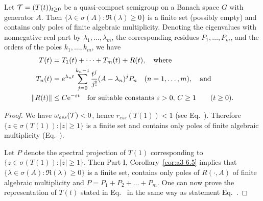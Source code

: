 \begin{theorem}\label{thm:b4-2.10}
  Let $\TT = (T(t))_{t \geq 0}$ be a quasi-compact semigroup on a Banach 
  space $G$ with generator $A$. Then 
  $\{\lambda \in \sigma(A) \colon \Re(\lambda) \geq 0\}$ is a finite set 
  (possibly empty) and contains only poles of finite algebraic multiplicity.
  Denoting the eigenvalues with nonneg­ative real part by 
  $\lambda_1, \dots, \lambda_m$, the corresponding residues 
  $P_1, \dots, P_m$, and the orders of the poles $k_1, \dots, k_m$, we have
  \begin{equation}\label{eq:b4-2.5}
    \begin{aligned}
      T(t) &= T_1(t) + \dots + T_m(t) + R(t), \quad \text{where} \\%
      T_n(t) &= e^{\lambda_n t} \sum_{j=0}^{k_n - 1} \frac{t^j}{j!}
               (A - \lambda_n)^j P_n
               \quad (n = 1, \dots, m), \quad \text{and} \\%
      \|R(t)\| &\leq C \eu^{-\epsilon t}
               \quad \text{for suitable constants } \epsilon > 0,\, C \geq 1
               \qquad (t \geq 0).
    \end{aligned}
  \end{equation}
\end{theorem}
\begin{proof} 
We have $\omega_{ess}(\mathcal{T}) < 0$, hence $r_{ess}(T(1)) < 1$ (see  Eq.~).
Therefore $\{z \in \sigma(T(1)) \colon |z| \geq 1\}$ is a finite set and contains only poles of finite algebraic multiplicity (\cf Eq.~). 

Let $P$ denote the spectral projection of\/ $T(1)$ corresponding to $\{z \in \sigma(T(1))\colon |z| \geq 1\}$. 
Then Part-I, Corollary~\ref{cor:a3-6.5} implies that $\{\lambda \in \sigma(A) \colon \Re(\lambda) \geq 0\}$ is a finite set, contains only poles of\/ $R(\cdot,A)$ of finite algebraic multiplicity and $P = P_1+P_2+ \ldots +P_m$. 
One can now prove the representation of\/ $T(t)$ stated in Eq.~ in the same way as statement Eq.~.
\end{proof}
